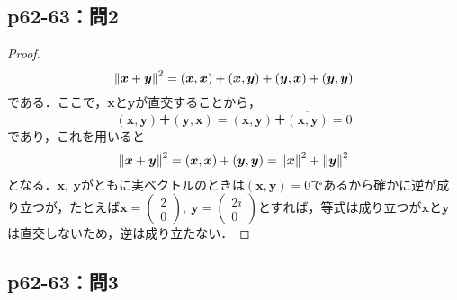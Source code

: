 \documentclass[uplatex,dvipdfmx,a4paper,11pt,fleqn]{jsarticle}
\begin{document}
\subsection*{p62-63：問2}
\begin{tleftbar}
    \begin{proof}
        \[
        \norm{\bm{x}+\bm{y}}^2=(\bm{x},\bm{x})+(\bm{x},\bm{y})+(\bm{y},\bm{x})+(\bm{y},\bm{y})
        \]
        である．ここで，$\bm{x}$と$\bm{y}$が直交することから，
        \[
            (\bm{x},\bm{y})＋(\bm{y},\bm{x})=(\bm{x},\bm{y})＋\overline{(\bm{x},\bm{y})}=0
            \]
            であり，これを用いると
        \[
            \norm{\bm{x}+\bm{y}}^2 =(\bm{x},\bm{x})+(\bm{y},\bm{y})=\norm{\bm{x}}^2 +\norm{\bm{y}}^2
        \]
        となる．$\bm{x},~\bm{y}$がともに実ベクトルのときは$(\bm{x},\bm{y})=0$であるから確かに逆が成り立つが，たとえば$\bm{x}=
        \begin{pmatrix}
            2 \\
            0
        \end{pmatrix}
        ,~
        \bm{y}=
        \begin{pmatrix}
            2i \\
            0
        \end{pmatrix}
        $とすれば，等式は成り立つが$\bm{x}$と$\bm{y}$は直交しないため，逆は成り立たない．
    \end{proof}
\end{tleftbar}

\subsection*{p62-63：問3}
\end{document}
